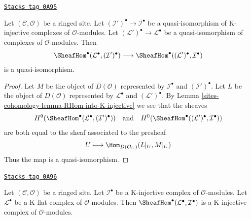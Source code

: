 \begin{lemma}
\label{sites-cohomology-lemma-RHom-well-defined}
\href{https://stacks.math.columbia.edu/tag/0A95}{\texttt{Stacks tag 0A95}}

Let $(\mathcal{C}, \mathcal{O})$ be a ringed site. Let
$(\mathcal{I}')^\bullet \to \mathcal{I}^\bullet$
be a quasi-isomorphism of K-injective complexes of $\mathcal{O}$-modules.
Let $(\mathcal{L}')^\bullet \to \mathcal{L}^\bullet$
be a quasi-isomorphism of complexes of $\mathcal{O}$-modules.
Then
$$
\SheafHom^\bullet(\mathcal{L}^\bullet, (\mathcal{I}')^\bullet)
\longrightarrow
\SheafHom^\bullet((\mathcal{L}')^\bullet, \mathcal{I}^\bullet)
$$
is a quasi-isomorphism.
\end{lemma}

\begin{proof}
Let $M$ be the object of $D(\mathcal{O})$ represented by
$\mathcal{I}^\bullet$ and $(\mathcal{I}')^\bullet$.
Let $L$ be the object of $D(\mathcal{O})$ represented by
$\mathcal{L}^\bullet$ and $(\mathcal{L}')^\bullet$.
By Lemma \ref{sites-cohomology-lemma-RHom-into-K-injective}
we see that the sheaves
$$
H^0(\SheafHom^\bullet(\mathcal{L}^\bullet, (\mathcal{I}')^\bullet))
\quad\text{and}\quad
H^0(\SheafHom^\bullet((\mathcal{L}')^\bullet, \mathcal{I}^\bullet))
$$
are both equal to the sheaf associated to the presheaf
$$
U \longmapsto \Hom_{D(\mathcal{O}_U)}(L|_U, M|_U)
$$
Thus the map is a quasi-isomorphism.
\end{proof}

\begin{lemma}
\label{sites-cohomology-lemma-RHom-from-K-flat-into-K-injective}
\href{https://stacks.math.columbia.edu/tag/0A96}{\texttt{Stacks tag 0A96}}

Let $(\mathcal{C}, \mathcal{O})$ be a ringed site. Let $\mathcal{I}^\bullet$
be a K-injective complex of $\mathcal{O}$-modules. Let
$\mathcal{L}^\bullet$ be a K-flat complex of $\mathcal{O}$-modules.
Then $\SheafHom^\bullet(\mathcal{L}^\bullet, \mathcal{I}^\bullet)$
is a K-injective complex of $\mathcal{O}$-modules.
\end{lemma}


